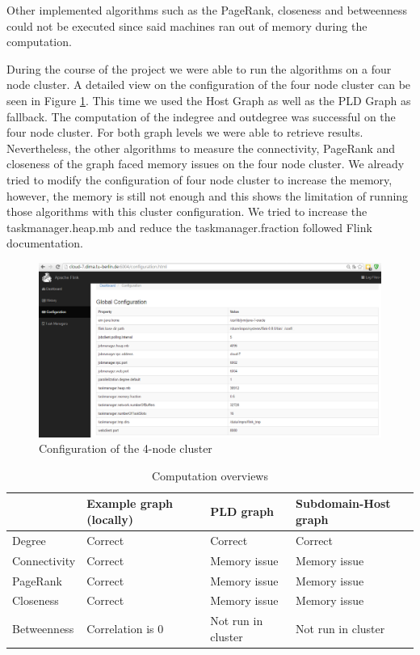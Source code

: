 Other implemented algorithms such as the PageRank, closeness and betweenness could not be executed since said machines ran out of memory during the computation.

During the course of the project we were able to run the algorithms on a four node cluster. A detailed view on the configuration of the four node cluster can be seen in Figure \ref{fig6a}. This time we used the Host Graph as well as the PLD Graph as fallback. The computation of the indegree and outdegree was successful on the four node cluster. For both graph levels we were able to retrieve results. Nevertheless, the other algorithms to measure the connectivity, PageRank and closeness of the graph faced memory issues on the four node cluster. We already tried to modify the configuration of four node cluster to increase the memory, however, the memory is still not enough and this shows the limitation of running those algorithms with this cluster configuration. We tried to increase the taskmanager.heap.mb and reduce the taskmanager.fraction followed Flink documentation.

\begin{figure}[H]
	\begin{center}
		\caption{Configuration of the 4-node cluster}		
		\label{fig6a}		
		\includegraphics[width=1.0\textwidth]{fig6a}	
	\end{center}
\end{figure}

\begin{table}[H]
	\caption{Computation overviews}
	\label{t3}
	\begin{center}
		\begin{tabular}{|l|l|l|l|}
			\hline		
				&Example graph (locally)	&PLD graph	&Subdomain-Host graph \\ \hline
			Degree	&Correct	&Correct	&Correct \\ \hline
			Connectivity	&Correct	&Memory issue	&Memory issue	\\ \hline
			PageRank	&Correct	&Memory issue	&Memory issue	\\ \hline
			Closeness	&Correct	&Memory issue	&Memory issue	\\ \hline
			Betweenness	&Correlation is 0	&Not run in cluster	&Not run in cluster	\\ \hline
		\end{tabular}
	\end{center}
\end{table}

